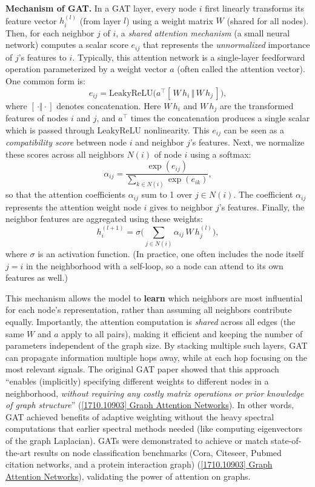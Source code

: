 \documentclass[12pt,a4paper]{report}
\begin{document}
\textbf{Mechanism of GAT.} In a GAT layer, every node \(i\) first linearly transforms its feature vector \(h_i^{(l)}\) (from layer \(l\)) using a weight matrix \(W\) (shared for all nodes). Then, for each neighbor \(j\) of \(i\), a \textit{shared attention mechanism} (a small neural network) computes a scalar score \(e_{ij}\) that represents the \textit{unnormalized} importance of \(j\)’s features to \(i\). Typically, this attention network is a single-layer feedforward operation parameterized by a weight vector \(a\) (often called the attention vector). One common form is:
\[
e_{ij} = \text{LeakyReLU}\!\Big(a^\top [\,W\,h_i \,\Vert\, W\,h_j\,]\Big),
\]
where \([\,\cdot \Vert \cdot]\) denotes concatenation. Here \(W\,h_i\) and \(W\,h_j\) are the transformed features of nodes \(i\) and \(j\), and \(a^\top\) times the concatenation produces a single scalar which is passed through LeakyReLU nonlinearity. This \(e_{ij}\) can be seen as a \textit{compatibility score} between node \(i\) and neighbor \(j\)’s features. Next, we normalize these scores across all neighbors \(N(i)\) of node \(i\) using a softmax:
\[
\alpha_{ij} = \frac{\exp(e_{ij})}{\sum_{k \in N(i)} \exp(e_{ik})},
\]
so that the attention coefficients \(\alpha_{ij}\) sum to 1 over \(j \in N(i)\). The coefficient \(\alpha_{ij}\) represents the attention weight node \(i\) gives to neighbor \(j\)’s features. Finally, the neighbor features are aggregated using these weights:
\[
h_i^{(l+1)} = \sigma\!\Big( \sum_{j \in N(i)} \alpha_{ij} \, W\,h_j^{(l)} \Big),
\]
where \(\sigma\) is an activation function. (In practice, one often includes the node itself \(j=i\) in the neighborhood with a self-loop, so a node can attend to its own features as well.)

This mechanism allows the model to \textbf{learn} which neighbors are most influential for each node’s representation, rather than assuming all neighbors contribute equally. Importantly, the attention computation is \textit{shared} across all edges (the same \(W\) and \(a\) apply to all pairs), making it efficient and keeping the number of parameters independent of the graph size. By stacking multiple such layers, GAT can propagate information multiple hops away, while at each hop focusing on the most relevant signals. The original GAT paper showed that this approach “enables (implicitly) specifying different weights to different nodes in a neighborhood, \textit{without requiring any costly matrix operations or prior knowledge of graph structure}” (\href{https://arxiv.org/abs/1710.10903#:~:text=attentional%20layers%20to%20address%20the,Our%20GAT%20models%20have}{[1710.10903] Graph Attention Networks}). In other words, GAT achieved benefits of adaptive weighting without the heavy spectral computations that earlier spectral methods needed (like computing eigenvectors of the graph Laplacian). GATs were demonstrated to achieve or match state-of-the-art results on node classification benchmarks (Cora, Citeseer, Pubmed citation networks, and a protein interaction graph) (\href{https://arxiv.org/abs/1710.10903#:~:text=applicable%20to%20inductive%20as%20well,graphs%20remain%20unseen%20during%20training}{[1710.10903] Graph Attention Networks}), validating the power of attention on graphs.
\end{document}
